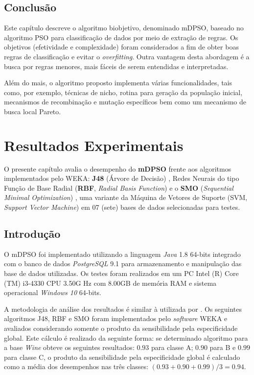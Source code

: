\documentclass[
	12pt,				%
	openany,			%
	oneside,	
	a4paper,			%
	brazil,				%
	]{unimontes-ppgmsc-abntex2}
\begin{document}
\section{Conclusão}

Este capítulo descreve o algoritmo biobjetivo, denominado mDPSO, baseado no algoritmo PSO para classificação de dados por meio de extração de regras. Os objetivos (efetividade e complexidade) foram considerados a fim de obter boas regras de classificação e evitar o {\em overfitting}. Outra vantagem desta abordagem é a busca por regras menores, mais fáceis de serem entendidas e interpretadas.  

Além do mais, o algoritmo proposto implementa várias funcionalidades, tais como, por exemplo, técnicas de nicho, rotina para geração da população inicial, mecanismos de recombinação e mutação específicos bem como um mecanismo de busca local Pareto. 




\chapter{Resultados Experimentais}
\label{ch:resultados}

O presente capítulo avalia o desempenho do \textbf{mDPSO} frente aos algoritmos implementados pelo WEKA: \textbf{J48} (Árvore de Decisão) \cite{Quinlan_1986},  Redes Neurais do tipo Função de Base Radial (\textbf{RBF}, {\em Radial Basis Function}) \cite{Broomhead_1988} e o \textbf{SMO} ({\em Sequential Minimal Optimization}) \cite{Keerthi_2001}, uma variante da Máquina de Vetores de Suporte (SVM, {\em Support Vector Machine}) em 07 (sete) bases de dados selecionadas para testes.

\section{Introdução}

O mDPSO foi implementado utilizando a linguagem {\em Java} 1.8 64-bits integrado com o banco de dados {\em PostgreSQL} 9.1 para armazenamento e manipulação das base de dados utilizadas. Os testes foram realizados em um PC Intel (R) Core (TM) i3-4330 CPU 3.50G Hz com 8.00GB de memória RAM e sistema operacional {\em Windows 10} 64-bits.

A metodologia de análise dos resultados é similar à utilizada por . Os seguintes algoritmos J48, RBF e SMO foram implementados pelo {\em software} WEKA e avaliados considerando somente o produto da sensibilidade pela especificidade global. Este cálculo é realizado da seguinte forma: se determinado algoritmo para a base {\em Wine} obteve os seguintes resultados: $0.93$ para classe A; $0.90$ para B e $0.99$ para classe C, o produto da sensibilidade pela especificidade global é calculado como a média dos desempenhos nas três classes: $(0.93+0.90+0.99)/3 = 0.94$. 
\end{document}
